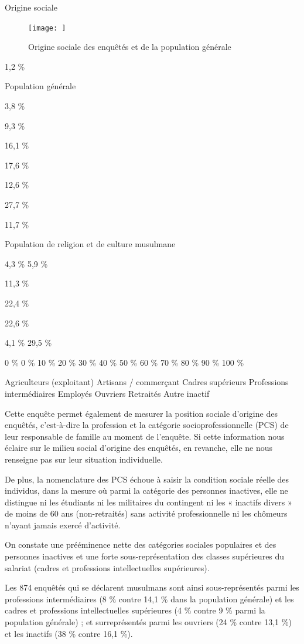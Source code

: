 Origine sociale



\begin{figure}
    \centering
    \texttt{[image: ]}
    \caption{Origine sociale des enquêtés et de la population générale}
    \label{fig:my_label}
\end{figure}

1,2 \%

Population générale

3,8 \%

9,3 \%

16,1 \%


17,6 \%

12,6 \%

27,7 \%


11,7 \%

Population de religion et de culture musulmane

4,3 \% 5,9 \%

11,3 \%


22,4 \%

22,6 \%


4,1 \% 29,5 \%

0 \% 0 \% 10 \% 20 \% 30 \% 40 \% 50 \% 60 \% 70 \% 80 \% 90 \% 100 \%

Agriculteurs (exploitant) Artisans / commerçant Cadres supérieurs
Professions intermédiaires Employés Ouvriers Retraités Autre inactif

Cette enquête permet également de mesurer la position sociale d'origine
des enquêtés, c'est-à-dire la profession et la catégorie
socioprofessionnelle (PCS) de leur responsable de famille au moment de
l'enquête. Si cette information nous éclaire sur le milieu social
d'origine des enquêtés, en revanche, elle ne nous renseigne pas sur leur
situation individuelle.

De plus, la nomenclature des PCS échoue à saisir la condition sociale
réelle des individus, dans la mesure où parmi la catégorie des personnes
inactives, elle ne distingue ni les étudiants ni les militaires du
contingent ni les « inactifs divers » de moins de 60 ans (non-retraités)
sans activité professionnelle ni les chômeurs n'ayant jamais exercé
d'activité.

On constate une prééminence nette des catégories sociales populaires et
des personnes inactives et une forte sous-représentation des classes
supérieures du salariat (cadres et professions intellectuelles
supérieures).

Les 874 enquêtés qui se déclarent musulmans sont ainsi sous-représentés
parmi les professions intermédiaires (8 \% contre 14,1 \% dans la
population générale) et les cadres et professions intellectuelles
supérieures (4 \% contre 9 \% parmi la population générale) ; et
surreprésentés parmi les ouvriers (24 \% contre 13,1 \%) et les inactifs
(38 \% contre 16,1 \%).




